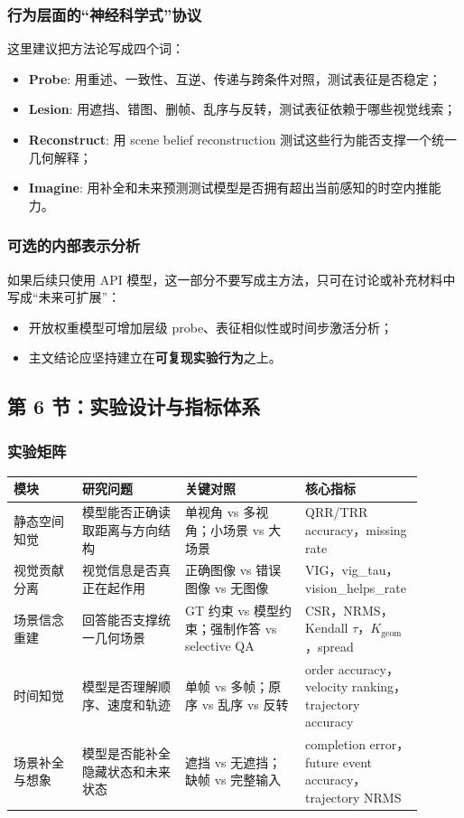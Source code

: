 \documentclass[UTF8,12pt,fontset=none]{ctexart}
\begin{document}
\subsubsection{行为层面的“神经科学式”协议}
这里建议把方法论写成四个词：
\begin{itemize}
  \item \textbf{Probe}: 用重述、一致性、互逆、传递与跨条件对照，测试表征是否稳定；
  \item \textbf{Lesion}: 用遮挡、错图、删帧、乱序与反转，测试表征依赖于哪些视觉线索；
  \item \textbf{Reconstruct}: 用 scene belief reconstruction 测试这些行为能否支撑一个统一几何解释；
  \item \textbf{Imagine}: 用补全和未来预测测试模型是否拥有超出当前感知的时空内推能力。
\end{itemize}

\subsubsection{可选的内部表示分析}
如果后续只使用 API 模型，这一部分不要写成主方法，只可在讨论或补充材料中写成“未来可扩展”：
\begin{itemize}
  \item 开放权重模型可增加层级 probe、表征相似性或时间步激活分析；
  \item 主文结论应坚持建立在\textbf{可复现实验行为}之上。
\end{itemize}

\subsection{第 6 节：实验设计与指标体系}

\subsubsection{实验矩阵}
\begin{longtable}{p{0.16\linewidth}p{0.24\linewidth}p{0.28\linewidth}p{0.22\linewidth}}
\toprule
模块 & 研究问题 & 关键对照 & 核心指标 \\
\midrule
静态空间知觉 & 模型能否正确读取距离与方向结构 & 单视角 vs 多视角；小场景 vs 大场景 & QRR/TRR accuracy，missing rate \\
\midrule
视觉贡献分离 & 视觉信息是否真正在起作用 & 正确图像 vs 错误图像 vs 无图像 & VIG，vig\_tau，vision\_helps\_rate \\
\midrule
场景信念重建 & 回答能否支撑统一几何场景 & GT 约束 vs 模型约束；强制作答 vs selective QA & CSR，NRMS，Kendall $\tau$，$K_{\text{geom}}$，spread \\
\midrule
时间知觉 & 模型是否理解顺序、速度和轨迹 & 单帧 vs 多帧；原序 vs 乱序 vs 反转 & order accuracy，velocity ranking，trajectory accuracy \\
\midrule
场景补全与想象 & 模型是否能补全隐藏状态和未来状态 & 遮挡 vs 无遮挡；缺帧 vs 完整输入 & completion error，future event accuracy，trajectory NRMS \\
\bottomrule
\end{longtable}
\end{document}

